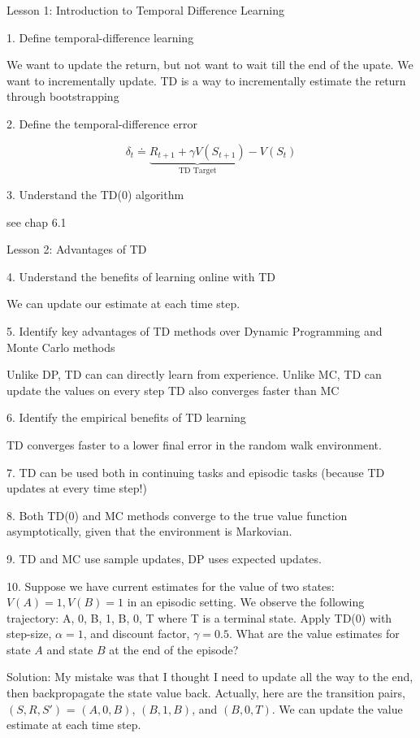 \documentclass[sutton_barto_notes.tex]{subfiles}
\begin{document}
Lesson 1: Introduction to Temporal Difference Learning

1. Define temporal-difference learning

We want to update the return, but not want to wait till the end of the upate. We want to incrementally update. TD is a way to incrementally estimate the return through bootstrapping

2. Define the temporal-difference error

$$\delta_t \doteq \underbrace{R_{t+1} + \gamma V(S_{t+1})}_\text{TD Target} - V(S_t)$$

3. Understand the TD(0) algorithm

see chap 6.1

Lesson 2: Advantages of TD

4. Understand the benefits of learning online with TD

We can update our estimate at each time step.

5. Identify key advantages of TD methods over Dynamic Programming and Monte Carlo methods

Unlike DP, TD can can directly learn from experience. Unlike MC, TD can update the values on every step TD also converges faster than MC

6. Identify the empirical benefits of TD learning

TD converges faster to a lower final error in the random walk environment.

7. TD can be used both in continuing tasks and episodic tasks (because TD updates at every time step!)

8. Both TD(0) and MC methods converge to the true value function asymptotically, given that the environment is Markovian.

9. TD and MC use sample updates, DP uses expected updates.

10. Suppose we have current estimates for the value of two states: $V(A) = 1, V(B) = 1$ in an episodic setting. We observe the following trajectory: A, 0, B, 1, B, 0, T where T is a terminal state. Apply TD(0) with step-size, $\alpha = 1$, and discount factor, $\gamma = 0.5$. What are the value estimates for state $A$ and state $B$ at the end of the episode?

Solution: My mistake was that I thought I need to update all the way to the end, then backpropagate the state value back.
Actually, here are the transition pairs, $(S, R, S')$ = $(A, 0, B)$, $(B, 1, B)$, and $(B, 0, T)$. We can update the value estimate at each time step.
\end{document}
